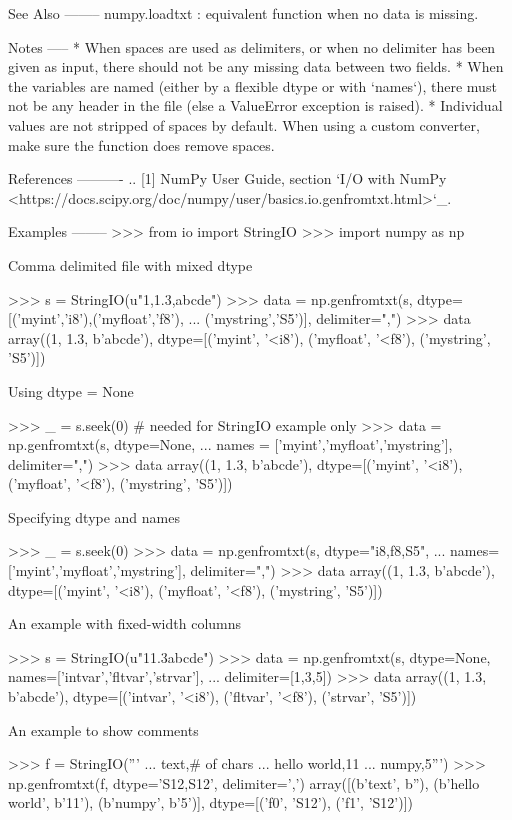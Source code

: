 \begin{DoxyVerb}
See Also
--------
numpy.loadtxt : equivalent function when no data is missing.

Notes
-----
* When spaces are used as delimiters, or when no delimiter has been given
  as input, there should not be any missing data between two fields.
* When the variables are named (either by a flexible dtype or with `names`),
  there must not be any header in the file (else a ValueError
  exception is raised).
* Individual values are not stripped of spaces by default.
  When using a custom converter, make sure the function does remove spaces.

References
----------
.. [1] NumPy User Guide, section `I/O with NumPy
       <https://docs.scipy.org/doc/numpy/user/basics.io.genfromtxt.html>`_.

Examples
--------
>>> from io import StringIO
>>> import numpy as np

Comma delimited file with mixed dtype

>>> s = StringIO(u"1,1.3,abcde")
>>> data = np.genfromtxt(s, dtype=[('myint','i8'),('myfloat','f8'),
... ('mystring','S5')], delimiter=",")
>>> data
array((1, 1.3, b'abcde'),
      dtype=[('myint', '<i8'), ('myfloat', '<f8'), ('mystring', 'S5')])

Using dtype = None

>>> _ = s.seek(0) # needed for StringIO example only
>>> data = np.genfromtxt(s, dtype=None,
... names = ['myint','myfloat','mystring'], delimiter=",")
>>> data
array((1, 1.3, b'abcde'),
      dtype=[('myint', '<i8'), ('myfloat', '<f8'), ('mystring', 'S5')])

Specifying dtype and names

>>> _ = s.seek(0)
>>> data = np.genfromtxt(s, dtype="i8,f8,S5",
... names=['myint','myfloat','mystring'], delimiter=",")
>>> data
array((1, 1.3, b'abcde'),
      dtype=[('myint', '<i8'), ('myfloat', '<f8'), ('mystring', 'S5')])

An example with fixed-width columns

>>> s = StringIO(u"11.3abcde")
>>> data = np.genfromtxt(s, dtype=None, names=['intvar','fltvar','strvar'],
...     delimiter=[1,3,5])
>>> data
array((1, 1.3, b'abcde'),
      dtype=[('intvar', '<i8'), ('fltvar', '<f8'), ('strvar', 'S5')])

An example to show comments

>>> f = StringIO('''
... text,# of chars
... hello world,11
... numpy,5''')
>>> np.genfromtxt(f, dtype='S12,S12', delimiter=',')
array([(b'text', b''), (b'hello world', b'11'), (b'numpy', b'5')],
  dtype=[('f0', 'S12'), ('f1', 'S12')])\end{DoxyVerb}
 \mbox{\label{namespacenumpy_1_1lib_1_1npyio_a2e09f4f148164c428707c34996ade895}} 
